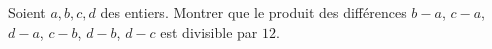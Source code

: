 Soient $a, b, c, d$ des entiers. Montrer que le produit des différences $b - a$, $c - a$, $d - a$, $c - b$, $d - b$, $d - c$ est divisible par $12$.
